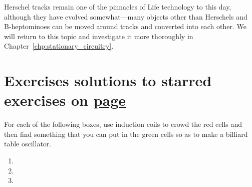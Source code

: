 Herschel tracks remain one of the pinnacles of Life technology to this day, although they have evolved somewhat---many objects other than Herschels and B-heptominoes can be moved around tracks and converted into each other. We will return to this topic and investigate it more thoroughly in Chapter~\ref{chp:stationary_circuitry}.


\filbreak


\section*{Exercises \hfill \normalfont\textsf{\small solutions to starred exercises on \hyperlink{solutions_oscillators}{page \pageref{solutions_oscillators}}}}
\label{sec:oscillators_exercises}
\vspace*{-0.4cm}\hrulefill\vspace*{-0.3cm}\footnotesize\begin{multicols}{2}\vspace*{-0.4cm}\raggedcolumns{}
	\setlength{\parskip}{0pt}\ifdefined\FORPRINTING{}\else%
\fi
	
	\begin{problemstar}\label{exer:billiard_tables} 
		For each of the following boxes, use induction coils to crowd the red cells and then find something that you can put in the green cells so as to make a billiard table oscillator.\vspace*{-0.25cm}
		
		\begin{multicols}{2}
			\begin{enumerate}
				\item[\bf\color{ocre}(a)] 
				
				\item[\bf\color{ocre}(c)] 
				
				\item[\bf\color{ocre}(b)] 
			\end{enumerate}
		\end{multicols}
	\end{problemstar}
	
	
	\mfilbreak
	

\end{multicols}
